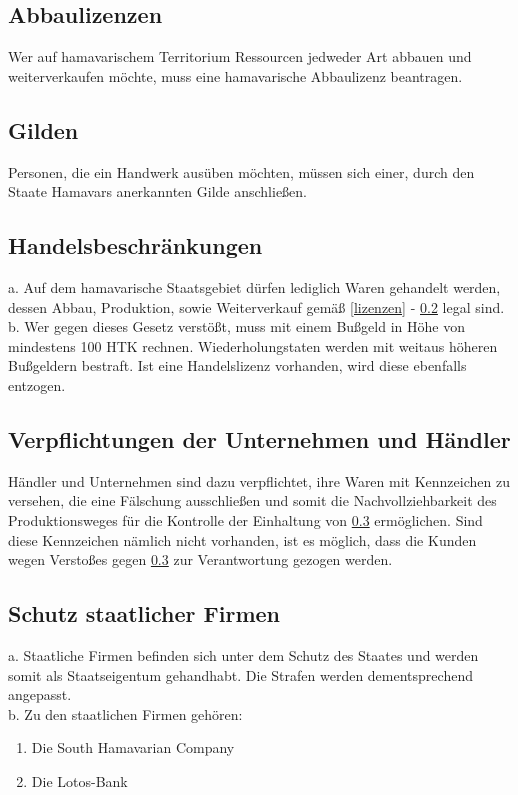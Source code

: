 \documentclass{article}
\begin{document}
\subsection{Abbaulizenzen}
Wer auf hamavarischem Territorium Ressourcen jedweder Art abbauen und weiterverkaufen möchte, muss eine hamavarische Abbaulizenz beantragen.

\subsection{Gilden}\label{gilden}
Personen, die ein Handwerk ausüben möchten, müssen sich einer, durch den Staate Hamavars anerkannten Gilde anschließen.

\subsection{Handelsbeschränkungen}\label{beschraenkungen}
a. Auf dem hamavarische Staatsgebiet dürfen lediglich Waren gehandelt werden, dessen Abbau, Produktion, sowie Weiterverkauf gemäß \ref{lizenzen} - \ref{gilden} legal sind.\\
b. Wer gegen dieses Gesetz verstößt, muss mit einem Bußgeld in Höhe von mindestens 100 HTK rechnen. Wiederholungstaten werden mit weitaus höheren Bußgeldern bestraft. Ist eine Handelslizenz vorhanden, wird diese ebenfalls entzogen.

\subsection{Verpflichtungen der Unternehmen und Händler}
Händler und Unternehmen sind dazu verpflichtet, ihre Waren mit Kennzeichen zu versehen, die eine Fälschung ausschließen und somit die Nachvollziehbarkeit des Produktionsweges für die Kontrolle der Einhaltung von \ref{beschraenkungen} ermöglichen. Sind diese Kennzeichen nämlich nicht vorhanden, ist es möglich, dass die Kunden wegen Verstoßes gegen \ref{beschraenkungen} zur Verantwortung gezogen werden.

\subsection{Schutz staatlicher Firmen}
a. Staatliche Firmen befinden sich unter dem Schutz des Staates und werden somit als Staatseigentum gehandhabt. Die Strafen werden dementsprechend angepasst.\\
b. Zu den staatlichen Firmen gehören:
\begin{enumerate}
	\item Die South Hamavarian Company
	\item Die Lotos-Bank
\end{enumerate}
\end{document}
